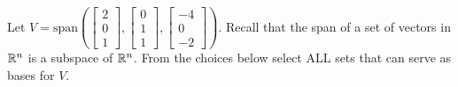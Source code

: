\documentclass{ximera}
\author{Anna Davis}
\begin{document}
\begin{exercise}
Let $V=\text{span}\left(\begin{bmatrix}2\\0\\1\end{bmatrix},\begin{bmatrix}0\\1\\1\end{bmatrix}, \begin{bmatrix}-4\\0\\-2\end{bmatrix}\right)$.
Recall that the span of a set of vectors in $\mathbb{R}^n$ is a subspace of $\mathbb{R}^n$.  From the choices below select ALL sets that can serve as bases for $V$.

\begin{selectAll}
  \end{selectAll}
\end{exercise}
\end{document}
